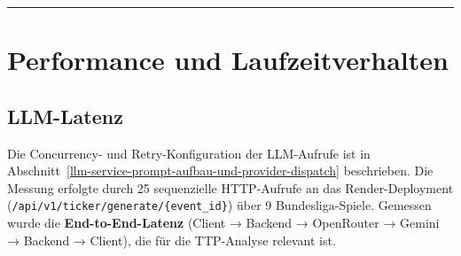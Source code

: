 \begin{center}\rule{0.5\linewidth}{0.5pt}\end{center}

\section{Performance und
Laufzeitverhalten}\label{performance-und-laufzeitverhalten}

\subsection{LLM-Latenz}\label{llm-latenz}

Die Concurrency- und Retry-Konfiguration der LLM-Aufrufe ist in
Abschnitt~\ref{llm-service-prompt-aufbau-und-provider-dispatch} beschrieben. Die Messung erfolgte durch 25 sequenzielle
HTTP-Aufrufe an das Render-Deployment
(\texttt{/api/v1/ticker/generate/\{event\_id\}}) über 9
Bundesliga-Spiele. Gemessen wurde die \textbf{End-to-End-Latenz} (Client
→ Backend → OpenRouter → Gemini → Backend → Client), die für die
TTP-Analyse relevant ist.

